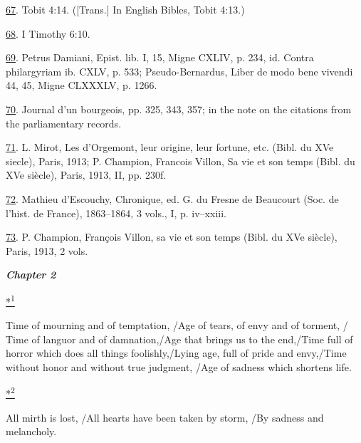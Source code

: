 \protect\hypertarget{23_NOTES.xhtmlux5cux23id_2099}{\protect\hyperlink{08_Chapter_One__THE_PASSIONATE_INTE.xhtmlux5cux23id_2098}{67}}.
Tobit 4:14. ({[}Trans.{]} In English Bibles, Tobit 4:13.)

\protect\hypertarget{23_NOTES.xhtmlux5cux23id_2097}{\protect\hyperlink{08_Chapter_One__THE_PASSIONATE_INTE.xhtmlux5cux23id_2096}{68}}.
I Timothy 6:10.

\protect\hypertarget{23_NOTES.xhtmlux5cux23id_2095}{\protect\hyperlink{08_Chapter_One__THE_PASSIONATE_INTE.xhtmlux5cux23id_2094}{69}}.
Petrus Damiani, Epist. lib. I, 15, Migne CXLIV, p. 234, id. Contra
philargyriam ib. CXLV, p. 533; Pseudo-Bernardus, Liber de modo bene
vivendi 44, 45, Migne CLXXXLV, p. 1266.

\protect\hypertarget{23_NOTES.xhtmlux5cux23id_2093}{\protect\hyperlink{08_Chapter_One__THE_PASSIONATE_INTE.xhtmlux5cux23id_2092}{70}}.
Journal d'un bourgeois, pp. 325, 343, 357; in the note on the citations
from the parliamentary records.

\protect\hypertarget{23_NOTES.xhtmlux5cux23id_2091}{\protect\hyperlink{08_Chapter_One__THE_PASSIONATE_INTE.xhtmlux5cux23id_2090}{71}}.
L. Mirot, Les d'Orgemont, leur origine, leur fortune, etc. (Bibl. du XVe
siecle), Paris, 1913; P. Champion, Francois Villon, Sa vie et son temps
(Bibl. du XVe siècle), Paris, 1913, II, pp. 230f.

\protect\hypertarget{23_NOTES.xhtmlux5cux23id_2089}{\protect\hyperlink{08_Chapter_One__THE_PASSIONATE_INTE.xhtmlux5cux23id_2088}{72}}.
Mathieu d'Escouchy, Chronique, ed. G. du Fresne de Beaucourt (Soc. de
l'hist. de France), 1863--1864, 3 vols., I, p. iv--xxiii.

\protect\hypertarget{23_NOTES.xhtmlux5cux23id_2087}{\protect\hyperlink{08_Chapter_One__THE_PASSIONATE_INTE.xhtmlux5cux23id_2086}{73}}.
P. Champion, François Villon, sa vie et son temps (Bibl. du XVe siècle),
Paris, 1913, 2 vols.

\textbf{\emph{Chapter 2}}

\protect\hypertarget{23_NOTES.xhtmlux5cux23id_2412}{\protect\hyperlink{09_Chapter_Two__THE_CRAVING_FOR_A_M.xhtmlux5cux23id_2411}{*\textsuperscript{1}}}
Time of mourning and of temptation, /Age of tears, of envy and of
torment, / Time of languor and of damnation,/Age that brings us to the
end,/Time full of horror which does all things foolishly,/Lying age,
full of pride and envy,/Time without honor and without true judgment,
/Age of sadness which shortens life.

\protect\hypertarget{23_NOTES.xhtmlux5cux23id_2414}{\protect\hyperlink{09_Chapter_Two__THE_CRAVING_FOR_A_M.xhtmlux5cux23id_2413}{*\textsuperscript{2}}}
All mirth is lost, /All hearts have been taken by storm, /By sadness and
melancholy.

